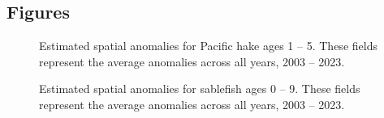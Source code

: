 \documentclass[
]{article}
\begin{document}
\subsection{Figures}\label{figures}

\begin{figure}


\caption{\label{fig-hake-spatial-anomaly}Estimated spatial anomalies for
Pacific hake ages 1 -- 5. These fields represent the average anomalies
across all years, 2003 -- 2023.}

\end{figure}%

\newpage

\begin{figure}


\caption{\label{fig-sablefish-spatial-anomaly}Estimated spatial
anomalies for sablefish ages 0 -- 9. These fields represent the average
anomalies across all years, 2003 -- 2023.}

\end{figure}%

\newpage
\end{document}
